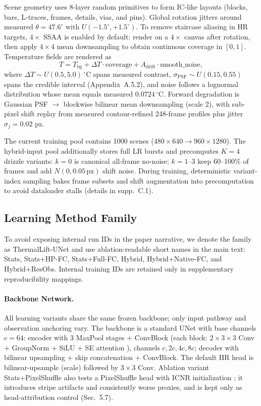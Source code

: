 Scene geometry uses 8-layer random primitives to form IC-like layouts (blocks, bars, L-traces, frames, details, vias, and pins). Global rotation jitters around measured $\theta=47.6^\circ$ with $U(-1.5^\circ,+1.5^\circ)$. To remove staircase aliasing in HR targets, $4\times$ SSAA is enabled by default: render on a $4\times$ canvas after rotation, then apply $4\times4$ mean downsampling to obtain continuous coverage in $[0,1]$. Temperature fields are rendered as
\[
T=T_{\mathrm{bg}}+\Delta T\cdot\text{coverage}+A_{\mathrm{drift}}\cdot\text{smooth\_noise},
\]
where $\Delta T\sim U(0.5,5.0)\,^\circ\mathrm{C}$ spans measured contrast, $\sigma_{\mathrm{PSF}}\sim U(0.15,0.55)$ spans the credible interval (Appendix~A.5.2), and noise follows a lognormal distribution whose mean equals measured $0.0724\,^\circ\mathrm{C}$. Forward degradation is Gaussian PSF $\to$ blockwise bilinear mean downsampling (scale 2), with sub-pixel shift replay from measured contour-refined 248-frame profiles plus jitter $\sigma_j=0.02$ px.

The current training pool contains 1000 scenes ($480\times640 \to 960\times1280$). The hybrid-input pool additionally stores full LR bursts and precomputes $K=4$ drizzle variants: $k=0$ is canonical all-frame no-noise; $k=1\text{--}3$ keep 60--100\% of frames and add $N(0,0.05\,\text{px})$ shift noise. During training, deterministic variant-index sampling bakes frame subsets and shift augmentation into precomputation to avoid dataloader stalls (details in supp.~C.1).

\subsection{Learning Method Family}

To avoid exposing internal run IDs in the paper narrative, we denote the family as ThermalLift-UNet and use ablation-readable short names in the main text: Stats, Stats+HP-FC, Stats+Full-FC, Hybrid, Hybrid+Native-FC, and Hybrid+ResObs. Internal training IDs are retained only in supplementary reproducibility mappings.

\paragraph{Backbone Network.}
All learning variants share the same frozen backbone; only input pathway and observation anchoring vary. The backbone is a standard UNet \citep{ronneberger2015unet} with base channels $c=64$: encoder with 3 MaxPool stages + ConvBlock (each block: $2\times3\times3$ Conv + GroupNorm \citep{wu2018group} + SiLU + SE attention \citep{hu2018squeeze}), channels $c,2c,4c,8c$; decoder with bilinear upsampling + skip concatenation + ConvBlock. The default HR head is bilinear-upsample (scale) followed by $3\times3$ Conv. Ablation variant Stats+PixelShuffle also tests a PixelShuffle head \citep{shi2016realtime} with ICNR initialization \citep{aitken2017checkerboard}; it introduces stripe artifacts and consistently worse proxies, and is kept only as head-attribution control (Sec.~5.7).

